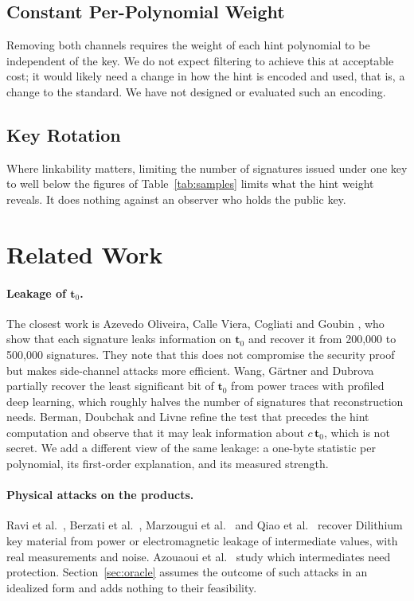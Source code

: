 \documentclass{article}
\newcommand{\tzero}{\mathbf{t}_0}
\begin{document}
\subsection{Constant Per-Polynomial Weight}
\label{sec:cwencode}

Removing both channels requires the weight of each hint polynomial to be
independent of the key.  We do not expect filtering to achieve this at
acceptable cost; it would likely need a change in how the hint is encoded and used, that is, a
change to the standard.  We have not designed or evaluated such an encoding.

\subsection{Key Rotation}

Where linkability matters, limiting the number of signatures issued under one
key to well below the figures of Table~\ref{tab:samples} limits what the hint
weight reveals.  It does nothing against an observer who holds the public key.

\section{Related Work}
\label{sec:related}

\paragraph{Leakage of $\tzero$.}
The closest work is Azevedo Oliveira, Calle Viera, Cogliati and Goubin
\cite{azevedo2024uncompressing}, who show that each signature leaks
information on $\tzero$ and recover it from 200,000 to 500,000 signatures.
They note that this does not compromise the security proof but makes
side-channel attacks more efficient.  Wang, G\"artner and Dubrova \cite{wang2024decompressing} partially recover
the least significant bit of $\tzero$ from power traces with profiled deep
learning, which roughly halves the number of signatures that reconstruction
needs.  Berman, Doubchak and Livne
\cite{berman2024note} refine the test that precedes the hint computation and
observe that it may leak information about $c\,\tzero$, which is not secret.
We add a different view of the same leakage: a one-byte statistic per
polynomial, its first-order explanation, and its measured strength.

\paragraph{Physical attacks on the products.}
Ravi et al.\ \cite{ravi2018side}, Berzati et al.\ \cite{berzati2023exploiting},
Marzougui et al.\ \cite{marzougui2022profiling} and Qiao et al.\
\cite{qiao2023ntt} recover Dilithium key material from power or
electromagnetic leakage of intermediate values, with real measurements and
noise.  Azouaoui et al.\ \cite{azouaoui2023protecting} study which
intermediates need protection.  Section~\ref{sec:oracle} assumes the outcome
of such attacks in an idealized form and adds nothing to their feasibility.
\end{document}
